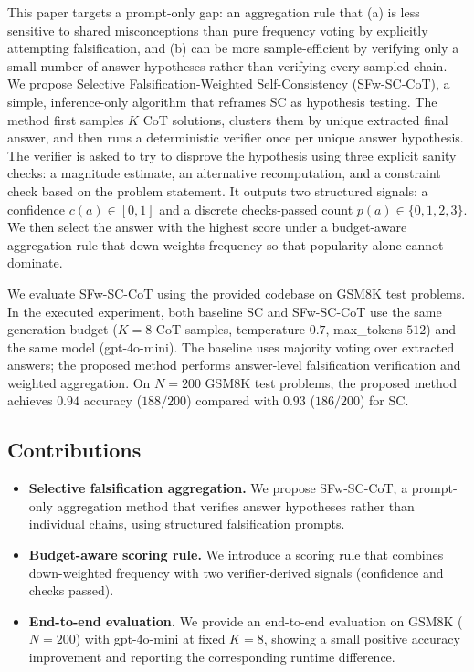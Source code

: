 \documentclass[journal,article,accept,pdftex,moreauthors]{Definitions/mdpi}
\begin{document}
This paper targets a prompt-only gap: an aggregation rule that (a) is less sensitive to shared misconceptions than pure frequency voting by explicitly attempting falsification, and (b) can be more sample-efficient by verifying only a small number of answer hypotheses rather than verifying every sampled chain. We propose Selective Falsification-Weighted Self-Consistency (SFw-SC-CoT), a simple, inference-only algorithm that reframes SC as hypothesis testing. The method first samples $K$ CoT solutions, clusters them by unique extracted final answer, and then runs a deterministic verifier once per unique answer hypothesis. The verifier is asked to try to disprove the hypothesis using three explicit sanity checks: a magnitude estimate, an alternative recomputation, and a constraint check based on the problem statement. It outputs two structured signals: a confidence $c(a) \in [0,1]$ and a discrete checks-passed count $p(a) \in \{0,1,2,3\}$. We then select the answer with the highest score under a budget-aware aggregation rule that down-weights frequency so that popularity alone cannot dominate.

We evaluate SFw-SC-CoT using the provided codebase on GSM8K test problems. In the executed experiment, both baseline SC and SFw-SC-CoT use the same generation budget ($K = 8$ CoT samples, temperature $0.7$, max\_tokens $512$) and the same model (gpt-4o-mini). The baseline uses majority voting over extracted answers; the proposed method performs answer-level falsification verification and weighted aggregation. On $N = 200$ GSM8K test problems, the proposed method achieves $0.94$ accuracy ($188/200$) compared with $0.93$ ($186/200$) for SC\@.

\subsection{Contributions}
\begin{itemize}
\item \textbf{Selective falsification aggregation.} We propose SFw-SC-CoT, a prompt-only aggregation method that verifies answer hypotheses rather than individual chains, using structured falsification prompts.
\item \textbf{Budget-aware scoring rule.} We introduce a scoring rule that combines down-weighted frequency with two verifier-derived signals (confidence and checks passed).
\item \textbf{End-to-end evaluation.} We provide an end-to-end evaluation on GSM8K ($N = 200$) with gpt-4o-mini at fixed $K = 8$, showing a small positive accuracy improvement and reporting the corresponding runtime difference.
\end{itemize}
\end{document}
